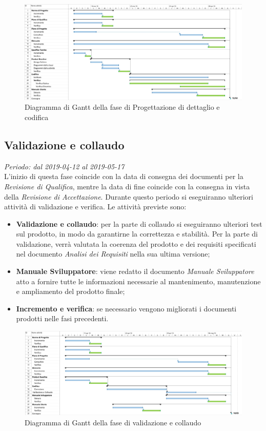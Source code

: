 \begin{figure}[H]
	\includegraphics[width=0.99\linewidth]{res/images/gantt_pd.jpg}
	\caption{Diagramma di Gantt della fase di Progettazione di dettaglio e codifica}
\end{figure}
\pagebreak


\subsection{Validazione e collaudo}
\textit{Periodo: dal 2019-04-12 al 2019-05-17 } \\
L'inizio di questa fase coincide con la data di consegna dei documenti per la 
\textit{Revisione di Qualifica}, mentre la data di fine coincide con la 
consegna in vista della \textit{Revisione di Accettazione}. Durante questo periodo 
si eseguiranno ulteriori attività di validazione e verifica. Le attività 
previste sono: 
\begin{itemize}
	\item \textbf{Validazione e collaudo}: per la parte di collaudo si 
	eseguiranno ulteriori test sul prodotto, in modo da garantirne la 
	correttezza e stabilità. Per la parte di validazione, verrà 
	valutata la coerenza del prodotto e dei requisiti specificati nel documento 
	\textit{Analisi dei Requisiti} nella sua ultima versione;
	\item \textbf{Manuale Sviluppatore}: viene redatto il documento \textit{Manuale Sviluppatore} atto a fornire tutte le informazioni necessarie al mantenimento, manutenzione e ampliamento del prodotto finale;
	\item \textbf{Incremento e verifica}: se necessario vengono migliorati i 
	documenti prodotti nelle fasi precedenti.
\end{itemize}
\begin{figure}[H]
	\includegraphics[width=0.99\linewidth]{res/images/gantt_val.jpg}
	\caption{Diagramma di Gantt della fase di validazione e collaudo}
\end{figure}